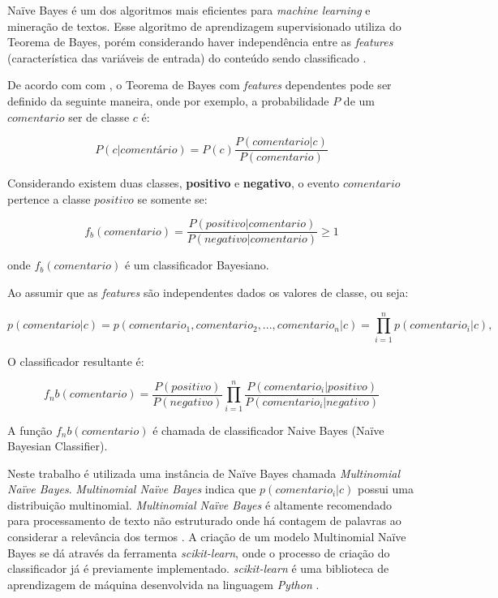 Naïve Bayes é um dos algoritmos mais eficientes para \textit{machine learning} e mineração de textos. Esse algoritmo de aprendizagem supervisionado utiliza do Teorema de Bayes, porém considerando haver independência entre as \textit{features} (característica das variáveis de entrada) do conteúdo sendo classificado \cite{zhang2004optimalitybayes}.

De acordo com com \cite{zhang2004optimalitybayes}, o Teorema de Bayes com \textit{features} dependentes pode ser definido da seguinte maneira, onde por exemplo, a probabilidade $P$ de um $comentario$ ser de classe $c$ é:

\begin{equation}
\label{eq:bayes_classic}
 P(c|comentário) = P(c) \frac{P(comentario |c)}{P(comentario)}
\end{equation}

Considerando existem duas classes, \textbf{positivo} e \textbf{negativo}, o evento $comentario$ pertence a classe $positivo$ se somente se:

\begin{equation}
\label{eq:bayes_classic}
 {f_b}(comentario) =  \frac{P(positivo| comentario)}{P(negativo| comentario)} \geq 1
\end{equation}

onde ${f_b}(comentario)$ é um classificador Bayesiano.

Ao assumir que as \textit{features} são independentes dados os valores de classe, ou seja:

\begin{equation}
\label{eq:naive_bayes}
 {p}(comentario|c) =  {p}({comentario_1, comentario_2, ..., comentario_n}|c) = \prod_{i=1}^{n} {p}(comentario_i|c),
\end{equation}

O classificador resultante é:

\begin{equation}
\label{eq:bayes_classic}
 {f_nb}(comentario) =  \frac{P(positivo)}{P(negativo)} \prod_{i=1}^{n} \frac{P({comentario_i} | positivo)}{P({comentario_i} | negativo)}
\end{equation}

A função ${f_nb}(comentario)$ é chamada de classificador Naive Bayes (Naïve Bayesian Classifier).


Neste trabalho é utilizada uma instância de Naïve Bayes chamada \textit{Multinomial Naïve Bayes}. \textit{Multinomial Naïve Bayes} indica que ${p}(comentario_i|c)$ possui uma distribuição multinomial. \textit{Multinomial Naïve Bayes} é altamente recomendado para processamento de texto não estruturado onde há contagem de palavras ao considerar a relevância dos termos \cite{metsis2006whichnaivebayes}.
A criação de um modelo Multinomial Naïve Bayes se dá através da ferramenta \textit{scikit-learn}, onde o processo de criação do classificador já é previamente implementado. \textit{scikit-learn} é uma biblioteca de aprendizagem de máquina desenvolvida na linguagem \textit{Python} \cite{scikit-learn}. 

